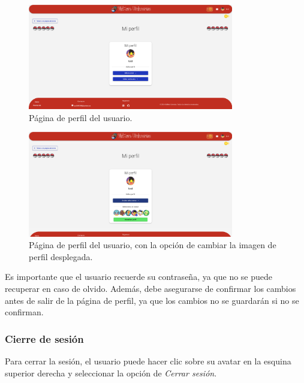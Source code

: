 \begin{enumerate}
\begin{figure}[H]
    \centering
    \includegraphics[width=0.8\textwidth]{figures/6-Analisis/6-Interfaz/interfaz/perfil1.png}
    \caption{Página de perfil del usuario.}
    \label{fig:interfaz-perfil1}
\end{figure}


\begin{figure}[H]
    \centering
    \includegraphics[width=0.8\textwidth]{figures/6-Analisis/6-Interfaz/interfaz/perfil2.png}
    \caption{Página de perfil del usuario, con la opción de cambiar la imagen de perfil desplegada.}
    \label{fig:interfaz-perfil2}
\end{figure}

Es importante que el usuario recuerde su contraseña, ya que no se puede recuperar en caso de olvido.
Además, debe asegurarse de confirmar los cambios antes de salir de la página de perfil, ya que los cambios no se guardarán si no se confirman.

\subsubsection{Cierre de sesión}
Para cerrar la sesión, el usuario puede hacer clic sobre  su avatar en la esquina superior derecha y seleccionar la opción de \textit{Cerrar sesión}.








\end{enumerate}
